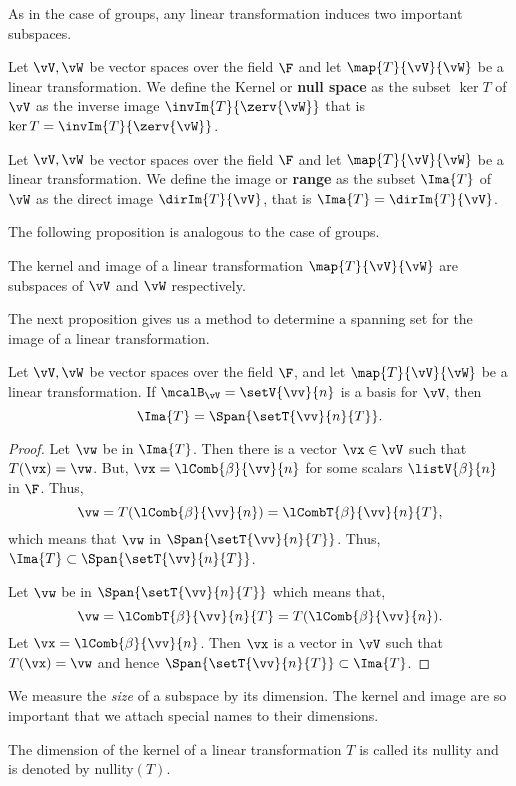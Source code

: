As in the case of groups, any linear transformation induces two important subspaces.
\begin{Definition}[name=Kernel]
    Let $\vV,\vW$ be vector spaces over the field $\F$ and let $\map{T}{\vV}{\vW}$ be a linear transformation. 
    We define the Kernel or \textbf{null space} as the subset $\ker{T}$ of $\vV$ as the inverse image
    $\invIm{T}{\zerv{\vW}}$ that is $\ker{T} = \invIm{T}{\zerv{\vW}}$.
\end{Definition}
\begin{Definition}[name=Image]
    Let $\vV,\vW$ be vector spaces over the field $\F$ and let $\map{T}{\vV}{\vW}$ be a linear transformation.
    We define the image or \textbf{range} as the subset $\Ima{T}$ of $\vW$ as the direct image
    $\dirIm{T}{\vV}$, that is $\Ima{T} = \dirIm{T}{\vV}$.
\end{Definition}
The following proposition is analogous to the case of groups.
\begin{Proposition}
    The kernel and image of a linear transformation $\map{T}{\vV}{\vW}$ are subspaces of $\vV$ and $\vW$
    respectively.
\end{Proposition}
The next proposition gives us a method to determine a spanning set for the image of a linear transformation.
\begin{Proposition}
    Let $\vV,\vW$ be vector spaces over the field $\F$, and let $\map{T}{\vV}{\vW}$ be a linear
    transformation. If $\mcalB_{\vV} = \setV{\vv}{n}$ is a basis for $\vV$, then
    \[\Ima{T} = \Span{\setT{\vv}{n}{T}}.\]
\end{Proposition}
\begin{proof}
    Let $\vw$ be in $\Ima{T}$. Then there is a vector $\vx \in \vV$ such that $T(\vx) = \vw$. But,
    $\vx = \lComb{\beta}{\vv}{n}$ for some scalars $\listV{\beta}{n}$ in $\F$. Thus,
    \[\vw = T(\lComb{\beta}{\vv}{n}) = \lCombT{\beta}{\vv}{n}{T},\]
    which means that $\vw$ in $\Span{\setT{\vv}{n}{T}}$. Thus, $\Ima{T} \subset \Span{\setT{\vv}{n}{T}}$.

    Let $\vw$ be in $\Span{\setT{\vv}{n}{T}}$ which means that,
    \[\vw = \lCombT{\beta}{\vv}{n}{T} = T(\lComb{\beta}{\vv}{n}).\]
    Let $\vx = \lComb{\beta}{\vv}{n}$. Then $\vx$ is a vector in $\vV$ such that $T(\vx) = \vw$ and hence
    $ \Span{\setT{\vv}{n}{T}} \subset \Ima{T}$.
\end{proof}
We measure the \emph{size} of a subspace by its dimension. The kernel and image are so important that we
attach special names to their dimensions.
\begin{Definition}[name=Nullity]
    The dimension of the kernel of a linear transformation $T$ is called its nullity and is denoted by
    nullity$(T)$.
\end{Definition}
